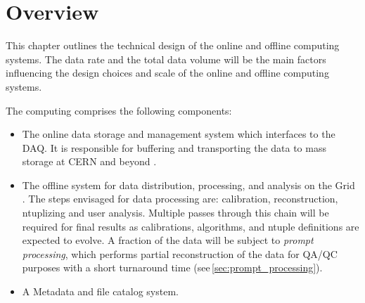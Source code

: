 \section{Overview}



This chapter outlines  the technical design of the online and offline computing systems.
The data rate and the total data volume will be the main factors influencing the design choices and scale of the \pd
online and offline computing systems.   

The \pd computing comprises the following components: 
\begin{itemize}

\item The online data storage and management system which interfaces to the DAQ. It is responsible for buffering
and transporting the data to mass storage at CERN and beyond \cite{comp_model}.

\item The offline system for data distribution, processing, and analysis on the Grid \cite{data_managm_sys}.  
The steps envisaged for data processing are: 
calibration, reconstruction, ntuplizing and user analysis.  Multiple passes through this chain will be required for final results as
calibrations, algorithms, and ntuple definitions are expected to evolve.
A fraction of the data will be subject to \textit{prompt processing}, which performs partial reconstruction of the data for QA/QC purposes
with a short turnaround time (see\,\ref{sec:prompt_processing}).

\item  A Metadata and file catalog system.
\end{itemize}




